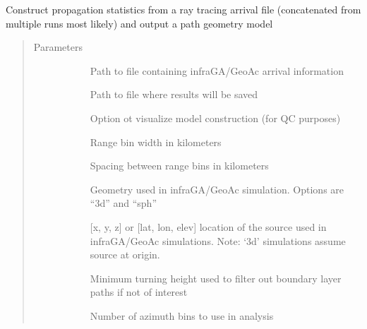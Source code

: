 \documentclass[letterpaper,10pt,english]{sphinxmanual}
\begin{document}
\begin{fulllineitems}
\begin{fulllineitems}
\label{\detokenize{stochprop.propagation:stochprop.propagation.PathGeometryModel.build}}
Construct propagation statistics from a ray tracing arrival file (concatenated from
multiple runs most likely) and output a path geometry model
\begin{quote}\begin{description}
\item[{Parameters}] \leavevmode\begin{description}
\item[{}] \leavevmode
Path to file containing infraGA/GeoAc arrival information

\item[{}] \leavevmode
Path to file where results will be saved

\item[{}] \leavevmode
Option ot visualize model construction (for QC purposes)

\item[{}] \leavevmode
Range bin width in kilometers

\item[{}] \leavevmode
Spacing between range bins in kilometers

\item[{}] \leavevmode
Geometry used in infraGA/GeoAc simulation.  Options are “3d” and “sph”

\item[{}] \leavevmode
{[}x, y, z{]} or {[}lat, lon, elev{]} location of the source used in infraGA/GeoAc simulations.  Note: ‘3d’ simulations assume source at origin.

\item[{}] \leavevmode
Minimum turning height used to filter out boundary layer paths if not of interest

\item[{}] \leavevmode
Number of azimuth bins to use in analysis


\end{description}
\end{description}
\end{quote}
\end{fulllineitems}
\end{fulllineitems}
\end{document}
